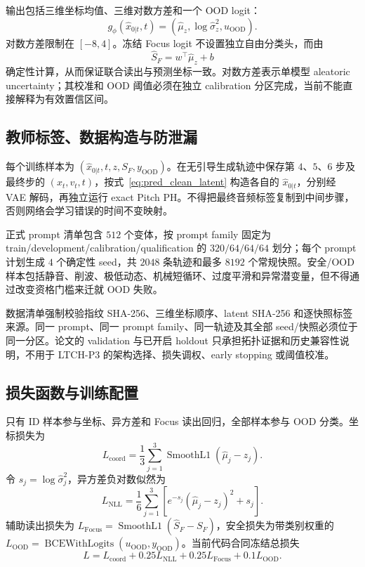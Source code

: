 \documentclass{article}
\begin{document}
输出包括三维坐标均值、三维对数方差和一个 OOD logit：
\begin{equation}
g_\phi(\hat{x}_{0|t},t)
=\left(\hat\mu_z,\log\hat\sigma_z^2,u_{\mathrm{OOD}}\right).
\end{equation}
对数方差限制在 $[-8,4]$。冻结 Focus logit 不设置独立自由分类头，而由
\begin{equation}
\hat S_F=w^\top\hat\mu_z+b
\end{equation}
确定性计算，从而保证联合读出与预测坐标一致。对数方差表示单模型 aleatoric uncertainty；其校准和 OOD 阈值必须在独立 calibration 分区完成，当前不能直接解释为有效置信区间。

\subsection{教师标签、数据构造与防泄漏}

每个训练样本为 $(\hat{x}_{0|t},t,z,S_F,y_{\mathrm{OOD}})$。在无引导生成轨迹中保存第 $4$、$5$、$6$ 步及最终步的 $(x_t,v_t,t)$，按式~\eqref{eq:pred_clean_latent} 构造各自的 $\hat{x}_{0|t}$，分别经 VAE 解码，再独立运行 exact Pitch PH。不得把最终音频标签复制到中间步骤，否则网络会学习错误的时间不变映射。

正式 prompt 清单包含 $512$ 个变体，按 prompt family 固定为 train/development/calibration/qualification 的 $320/64/64/64$ 划分；每个 prompt 计划生成 $4$ 个确定性 seed，共 $2048$ 条轨迹和最多 $8192$ 个常规快照。安全/OOD 样本包括静音、削波、极低动态、机械短循环、过度平滑和异常潜变量，但不得通过改变资格门槛来迁就 OOD 失败。

数据清单强制校验指纹 SHA-256、三维坐标顺序、latent SHA-256 和逐快照标签来源。同一 prompt、同一 prompt family、同一轨迹及其全部 seed/快照必须位于同一分区。论文的 validation 与已开启 holdout 只承担拓扑证据和历史兼容性说明，不用于 LTCH-P3 的架构选择、损失调权、early stopping 或阈值校准。

\subsection{损失函数与训练配置}

只有 ID 样本参与坐标、异方差和 Focus 读出回归，全部样本参与 OOD 分类。坐标损失为
\begin{equation}
L_{\mathrm{coord}}=
\frac{1}{3}\sum_{j=1}^{3}
\operatorname{SmoothL1}(\hat\mu_j-z_j).
\end{equation}
令 $s_j=\log\hat\sigma_j^2$，异方差负对数似然为
\begin{equation}
L_{\mathrm{NLL}}=
\frac{1}{6}\sum_{j=1}^{3}
\left[e^{-s_j}(\hat\mu_j-z_j)^2+s_j\right].
\end{equation}
辅助读出损失为 $L_{\mathrm{Focus}}=\operatorname{SmoothL1}(\hat S_F-S_F)$，安全损失为带类别权重的 $L_{\mathrm{OOD}}=\operatorname{BCEWithLogits}(u_{\mathrm{OOD}},y_{\mathrm{OOD}})$。当前代码合同冻结总损失
\begin{equation}
L=L_{\mathrm{coord}}+0.25L_{\mathrm{NLL}}
+0.25L_{\mathrm{Focus}}+0.1L_{\mathrm{OOD}}.
\label{eq:pitch3_total_loss}
\end{equation}
\end{document}
